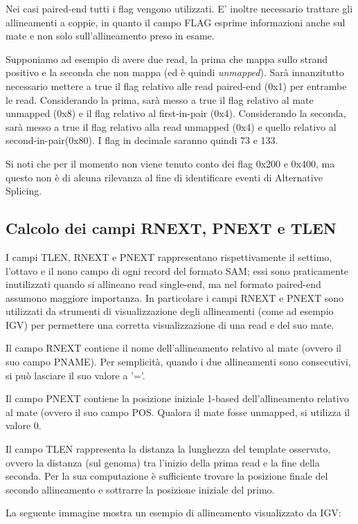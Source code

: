 Nei casi paired-end tutti i flag vengono utilizzati. E' inoltre necessario trattare gli allineamenti a coppie, in quanto il campo FLAG esprime informazioni anche sul mate e non solo sull'allineamento preso in esame. 

Supponiamo ad esempio di avere due read, la prima che mappa sullo strand positivo e la seconda che non mappa (ed è quindi \textit{unmapped}). Sarà innanzitutto necessario mettere a true il flag relativo alle read paired-end (0x1) per entrambe le read. Considerando la prima, sarà messo a true il flag relativo al mate unmapped (0x8) e il flag relativo al first-in-pair (0x4). Considerando la seconda, sarà messo a true il flag relativo alla read unmapped (0x4) e quello relativo al second-in-pair(0x80). I flag in decimale saranno quindi 73 e 133.

Si noti che per il momento non viene tenuto conto dei flag 0x200 e 0x400, ma questo non è di alcuna rilevanza al fine di identificare eventi di Alternative Splicing.

\newpage

\subsection{Calcolo dei campi RNEXT, PNEXT e TLEN}
I campi TLEN, RNEXT e PNEXT rappresentano rispettivamente il settimo, l'ottavo e il nono campo di ogni record del formato SAM; essi sono praticamente inutilizzati quando si allineano read single-end, ma nel formato paired-end assumono maggiore importanza. In particolare i campi RNEXT e PNEXT sono utilizzati da strumenti di visualizzazione degli allineamenti (come ad esempio IGV) per permettere una corretta visualizzazione di una read e del suo mate.

Il campo RNEXT contiene il nome dell'allineamento relativo al mate (ovvero il suo campo PNAME). Per semplicità, quando i due allineamenti sono consecutivi, si può lasciare il suo valore a '='.

Il campo PNEXT contiene la posizione iniziale 1-based dell'allineamento relativo al mate (ovvero il suo campo POS. Qualora il mate fosse unmapped, si utilizza il valore 0.

Il campo TLEN rappresenta la distanza la lunghezza del template osservato, ovvero la distanza (sul genoma) tra l'inizio della prima read e la fine della seconda. Per la sua computazione è sufficiente trovare la posizione finale del secondo allineamento e sottrarre la posizione iniziale del primo.

La seguente immagine mostra un esempio di allineamento visualizzato da IGV:

